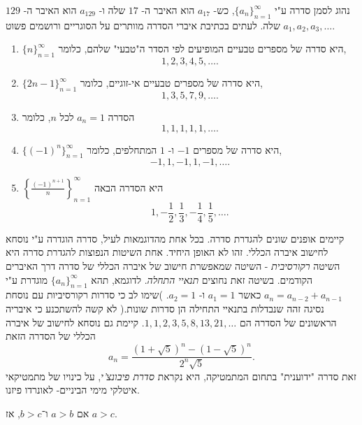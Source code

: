 \documentclass[12pt]{book}
\theoremstyle{plain}
\theoremstyle{definition}
\begin{document}
נהוג לסמן סדרה ע"י 
$\{a_n\}_{n=1}^\infty$, 
כש- 
$a_{17}$ 
הוא האיבר ה- 
$17$ 
שלה ו- 
$a_{129}$ 
הוא האיבר ה- 
$129$ 
שלה. 
לעתים בכתיבת איברי הסדרה מוותרים על הסוגריים ורושמים פשוט 
$a_1,a_2,a_3,\ldots$. 

\begin{exs}\rm
    \begin{enumerate}
         \item 
$\{n\}_{n=1}^\infty$ 
היא סדרה של מספרים טבעיים המופיעים לפי הסדר ה"טבעי" שלהם, כלומר,
$$1,2,3,4,5,\ldots.$$
\item $\{2n-1\}_{n=1}^\infty$ 
היא סדרה של מספרים טבעיים אי-זוגיים, 
כלומר, 
$$1,3,5,7,9,\ldots.$$
\item הסדרה 
$a_n=1$ 
לכל 
$n$, 
כלומר 
$$1,1,1,1,1,\ldots.$$
\item $\{(-1)^n\}_{n=1}^\infty$ 
היא סדרה של מספרים 
$-1$ 
ו- 
$1$ 
המתחלפים, כלומר, 
$$-1,1,-1,1,-1,\ldots.$$
\item $\left\{\frac{(-1)^{n+1}}{n}\right\}_{n=1}^\infty$ 
היא הסדרה הבאה 
$$1,-\frac{1}{2},\frac{1}{3},-\frac{1}{4},\frac{1}{5},\ldots.$$
    \end{enumerate}
\end{exs}


קיימים אופנים שונים להגדרת סדרה. בכל אחת מהדוגמאות לעיל, סדרה הוגדרה ע"י נוסחא לחישוב איברה הכללי. 
זהו לא האופן היחיד. 
אחת השיטות הנפוצות להגדרת סדרה היא השיטה 
{\it רקורסיבית} - 
השיטה שמאפשרת חישוב של איברה הכללי של סדרה דרך האיברים הקודמים. בשיטה זאת נחוצים 
{\it תנאיי התחלה}. 
לדוגמא, 
תהא 
$\{a_n\}_{n=1}^\infty$ 
מוגדרת ע"י 
$a_{n}=a_{n-2}+a_{n-1}$ 
כאשר 
$a_1=1$
ו- 
$a_2=1$. 
)שימו לב כי סדרות רקורסיביות עם נוסחת נסיגה זהה שנבדלות בתנאיי התחילה הן סדרות שונות.(
לא קשה להשתכנע כי איבריה הראשונים של הסדרה הם
$1,1,2,3,5,8,13,21,\ldots$. 
קיימת גם נוסחא לחישוב של איברה הכללי של הסדרה הזאת
$$a_n=\frac{(1+\sqrt{5})^n-(1-\sqrt{5})^n}{2^n\sqrt{5}}.$$
זאת סדרה "ידוענית" בתחום המתמטיקה, היא נקראת 
{\it סדרת פיבונצ'י}, 
על כינויו של מתמטיקאי איטלקי מימי הביניים- לאונרדו פיזנו.

\begin{theoremH}
אם \( a > b \) ו־\( b > c \), אז \( a > c \).
\end{theoremH}
\end{document}
